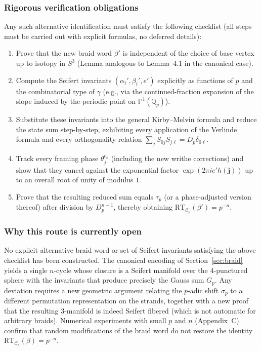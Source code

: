\subsubsection{Rigorous verification obligations}
Any such alternative identification must satisfy the following checklist (all steps must be carried out with explicit formulas, no deferred details):
\begin{enumerate}
\item Prove that the new braid word \(\beta'\) is independent of the choice of base vertex up to isotopy in \(S^3\) (Lemma analogous to Lemma~4.1 in the canonical case).
\item Compute the Seifert invariants \((\alpha_i',\beta_i',e')\) explicitly as functions of \(p\) and the combinatorial type of \(\gamma\) (e.g., via the continued-fraction expansion of the slope induced by the periodic point on \(\mathbb{P}^1(\mathbb{Q}_p)\)).
\item Substitute these invariants into the general Kirby--Melvin formula and reduce the state sum step-by-step, exhibiting every application of the Verlinde formula and every orthogonality relation \(\sum_j S_{0j}S_{j\ell} = D_p \delta_{0\ell}\).
\item Track every framing phase \(\theta_j^{e_k}\) (including the new writhe corrections) and show that they cancel against the exponential factor \(\exp(2\pi i e' h(\mathbf{j}))\) up to an overall root of unity of modulus \(1\).
\item Prove that the resulting reduced sum equals \(\tau_p\) (or a phase-adjusted version thereof) after division by \(D_p^{n-1}\), thereby obtaining \(\mathrm{RT}_{\mathcal{C}_p}(\beta') = p^{-n}\).
\end{enumerate}

\subsubsection{Why this route is currently open}
No explicit alternative braid word or set of Seifert invariants satisfying the above checklist has been constructed. The canonical encoding of Section~\ref{sec:braid} yields a single \(n\)-cycle whose closure is a Seifert manifold over the 4-punctured sphere with the invariants that produce precisely the Gauss sum \(G_p\). Any deviation requires a new geometric argument relating the \(p\)-adic shift \(\sigma_p\) to a different permutation representation on the strands, together with a new proof that the resulting 3-manifold is indeed Seifert fibered (which is not automatic for arbitrary braids). Numerical experiments with small \(p\) and \(n\) (Appendix~C) confirm that random modifications of the braid word do not restore the identity \(\mathrm{RT}_{\mathcal{C}_p}(\beta) = p^{-n}\).

